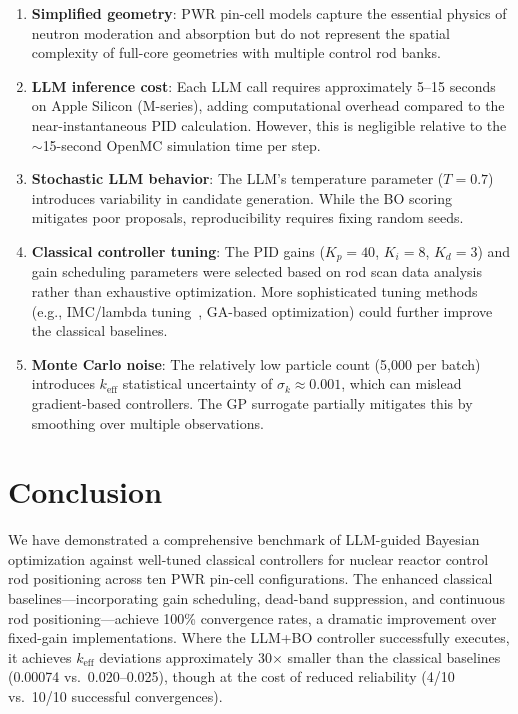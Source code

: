 \documentclass[11pt,twocolumn]{article}
\begin{document}
\begin{enumerate}
    \item \textbf{Simplified geometry}: PWR pin-cell models capture the essential physics of neutron moderation and absorption but do not represent the spatial complexity of full-core geometries with multiple control rod banks.

    \item \textbf{LLM inference cost}: Each LLM call requires approximately 5--15 seconds on Apple Silicon (M-series), adding computational overhead compared to the near-instantaneous PID calculation. However, this is negligible relative to the $\sim$15-second OpenMC simulation time per step.

    \item \textbf{Stochastic LLM behavior}: The LLM's temperature parameter ($T=0.7$) introduces variability in candidate generation. While the BO scoring mitigates poor proposals, reproducibility requires fixing random seeds.

    \item \textbf{Classical controller tuning}: The PID gains ($K_p\!=\!40$, $K_i\!=\!8$, $K_d\!=\!3$) and gain scheduling parameters were selected based on rod scan data analysis rather than exhaustive optimization. More sophisticated tuning methods (e.g., IMC/lambda tuning~\cite{eliasi2011robust}, GA-based optimization) could further improve the classical baselines.

    \item \textbf{Monte Carlo noise}: The relatively low particle count (5{,}000 per batch) introduces $k_\text{eff}$ statistical uncertainty of $\sigma_k \approx 0.001$, which can mislead gradient-based controllers. The GP surrogate partially mitigates this by smoothing over multiple observations.
\end{enumerate}

\section{Conclusion}
\label{sec:conclusion}

We have demonstrated a comprehensive benchmark of LLM-guided Bayesian optimization against well-tuned classical controllers for nuclear reactor control rod positioning across ten PWR pin-cell configurations.
The enhanced classical baselines---incorporating gain scheduling, dead-band suppression, and continuous rod positioning---achieve 100\% convergence rates, a dramatic improvement over fixed-gain implementations.
Where the LLM+BO controller successfully executes, it achieves $k_\text{eff}$ deviations approximately 30$\times$ smaller than the classical baselines (0.00074 vs.\ 0.020--0.025), though at the cost of reduced reliability (4/10 vs.\ 10/10 successful convergences).
\end{document}
